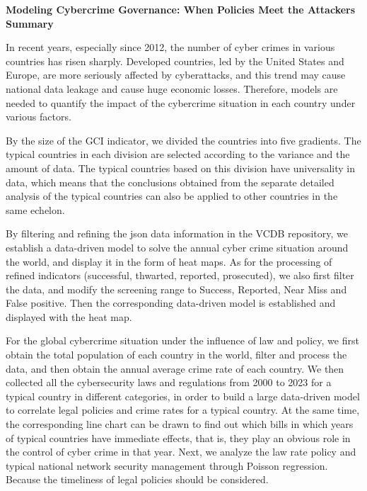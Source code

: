 \documentclass[12pt]{article}
\begin{document}
\begin{center}
	\fontsize{16}{19}\selectfont \textbf{Modeling Cybercrime Governance: When Policies Meet the Attackers} \\
	\bigskip
	\fontsize{16}{19}\selectfont \textbf{Summary} \\
\end{center}
\begin{adjustwidth}{2em}{2em}
	\hspace*{1.5em} In recent years, especially since 2012, the number of cyber crimes in various countries has risen sharply.
	Developed countries, led by the United States and Europe, are more seriously affected by cyberattacks,
	and this trend may cause national data leakage and cause huge economic losses.
	Therefore, models are needed to quantify the impact of the cybercrime situation in each country under various factors.

	By the size of the GCI indicator, we divided the countries into five gradients.
	The typical countries in each division are selected according to the variance and the amount of data.
	The typical countries based on this division have universality in data,
	which means that the conclusions obtained from the separate detailed analysis of the typical countries can also be applied to other countries in the same echelon.

	By filtering and refining the json data information in the VCDB repository,
	we establish a data-driven model to solve the annual cyber crime situation around the world, and display it in the form of heat maps.
	As for the processing of refined indicators (successful, thwarted, reported, prosecuted),
	we also first filter the data, and modify the screening range to Success, Reported, Near Miss and False positive.
	Then the corresponding data-driven model is established and displayed with the heat map.

	For the global cybercrime situation under the influence of law and policy,
	we first obtain the total population of each country in the world, filter and process the data, and then obtain the annual average crime rate of each country.
	We then collected all the cybersecurity laws and regulations from 2000 to 2023 for a typical country in different categories,
	in order to build a large data-driven model to correlate legal policies and crime rates for a typical country.
	At the same time, the corresponding line chart can be drawn to find out which bills in which years of typical countries have immediate effects,
	that is, they play an obvious role in the control of cyber crime in that year.
	Next, we analyze the law rate policy and typical national network security management through Poisson regression.
	Because the timeliness of legal policies should be considered.


\end{adjustwidth}
\end{document}
